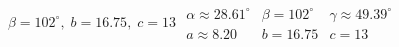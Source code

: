 { $\beta = 102^{\circ}, \; b = 16.75, \; c = 13$}
{$\begin{array}{lll}\alpha \approx 28.61^{\circ} & \beta = 102^{\circ} & \gamma \approx 49.39^{\circ} \\a \approx 8.20 & b = 16.75 & c = 13 \end{array}$}
